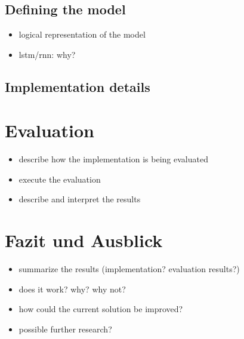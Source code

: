 \documentclass{IEEEtran}
\begin{document}
\subsection{Defining the model}
\label{subsec:modeldefinition}
\begin{itemize}
	\item logical representation of the model
	\item lstm/rnn: why?
\end{itemize}

\subsection{Implementation details}
\label{subsec:impldetails}

\section{Evaluation}
\label{sec:evaluation}
\begin{itemize}
	\item describe how the implementation is being evaluated
	\item execute the evaluation
	\item describe and interpret the results
\end{itemize}

\section{Fazit und Ausblick}
\label{sec:ausblick}
\begin{itemize}
	\item summarize the results (implementation? evaluation results?) 
	\item does it work? why? why not? 
	\item how could the current solution be improved? 
	\item possible further research? 
\end{itemize}

{}
\end{document}
